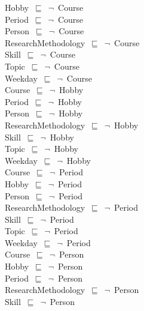 \documentclass{article}
\begin{document}
Hobby~\ensuremath{\sqsubseteq}~\ensuremath{\lnot}~Course\\
Period~\ensuremath{\sqsubseteq}~\ensuremath{\lnot}~Course\\
Person~\ensuremath{\sqsubseteq}~\ensuremath{\lnot}~Course\\
ResearchMethodology~\ensuremath{\sqsubseteq}~\ensuremath{\lnot}~Course\\
Skill~\ensuremath{\sqsubseteq}~\ensuremath{\lnot}~Course\\
Topic~\ensuremath{\sqsubseteq}~\ensuremath{\lnot}~Course\\
Weekday~\ensuremath{\sqsubseteq}~\ensuremath{\lnot}~Course\\
Course~\ensuremath{\sqsubseteq}~\ensuremath{\lnot}~Hobby\\
Period~\ensuremath{\sqsubseteq}~\ensuremath{\lnot}~Hobby\\
Person~\ensuremath{\sqsubseteq}~\ensuremath{\lnot}~Hobby\\
ResearchMethodology~\ensuremath{\sqsubseteq}~\ensuremath{\lnot}~Hobby\\
Skill~\ensuremath{\sqsubseteq}~\ensuremath{\lnot}~Hobby\\
Topic~\ensuremath{\sqsubseteq}~\ensuremath{\lnot}~Hobby\\
Weekday~\ensuremath{\sqsubseteq}~\ensuremath{\lnot}~Hobby\\
Course~\ensuremath{\sqsubseteq}~\ensuremath{\lnot}~Period\\
Hobby~\ensuremath{\sqsubseteq}~\ensuremath{\lnot}~Period\\
Person~\ensuremath{\sqsubseteq}~\ensuremath{\lnot}~Period\\
ResearchMethodology~\ensuremath{\sqsubseteq}~\ensuremath{\lnot}~Period\\
Skill~\ensuremath{\sqsubseteq}~\ensuremath{\lnot}~Period\\
Topic~\ensuremath{\sqsubseteq}~\ensuremath{\lnot}~Period\\
Weekday~\ensuremath{\sqsubseteq}~\ensuremath{\lnot}~Period\\
Course~\ensuremath{\sqsubseteq}~\ensuremath{\lnot}~Person\\
Hobby~\ensuremath{\sqsubseteq}~\ensuremath{\lnot}~Person\\
Period~\ensuremath{\sqsubseteq}~\ensuremath{\lnot}~Person\\
ResearchMethodology~\ensuremath{\sqsubseteq}~\ensuremath{\lnot}~Person\\
Skill~\ensuremath{\sqsubseteq}~\ensuremath{\lnot}~Person\\
\end{document}
